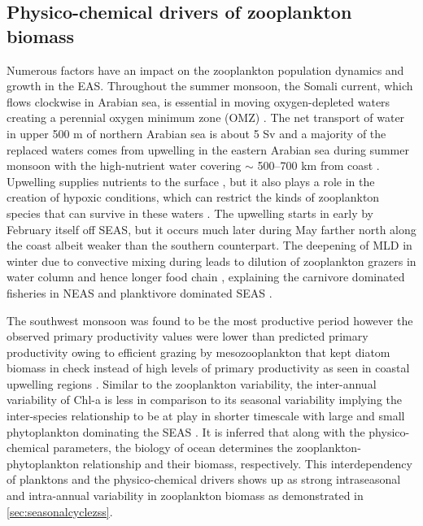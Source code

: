 \documentclass{article}
\begin{document}
	\subsection{Physico-chemical drivers of zooplankton biomass}
	Numerous factors have an impact on the zooplankton population dynamics and growth in the EAS. Throughout the summer monsoon, the Somali current, which flows clockwise in Arabian sea, is essential in moving oxygen-depleted waters creating a perennial oxygen minimum zone (OMZ) \citep{sarma2020potential,sudheesh2022omz}. The net transport of water in upper 500 m of northern Arabian sea is about 5 Sv and a majority of the replaced waters comes from upwelling in the eastern Arabian sea \citep{shi1999remotely} during summer monsoon with the high-nutrient water covering $\sim$ 500--700 km from coast \citep{morrison1998seasonal}. Upwelling supplies nutrients to the surface \citep{Kumar.2000}, but it also plays a role in the creation of hypoxic conditions, which can restrict the kinds of zooplankton species that can survive in these waters \citep{jayakumar.2004}. The upwelling starts in early by February itself off SEAS, but it occurs much later during May farther north along the coast \citep{banse1968hydrography,Kumar.2000,vijith2016consequences,sarma2020potential} albeit weaker than the southern counterpart. The deepening of MLD in winter due to convective mixing during \citep{marra2005jgofs, shankar2016inhibition,shi2022phytoplankton} leads to dilution of zooplankton grazers in water column \citep{marra2005jgofs} and hence longer food chain \citep{banse1995zooplankton,barber2001qn}, explaining the carnivore dominated fisheries in NEAS \citep{shankar2019role} and planktivore dominated SEAS \citep{longhurst1990gd,shankar2019role}. 
	
	The southwest monsoon was found to be the most productive period \citep{Kumar.2000} however the observed primary productivity values were lower than predicted primary productivity owing to efficient grazing by mesozooplankton that kept diatom biomass in check instead of high levels of primary productivity as seen in coastal upwelling regions \citep{barber2001qn}. Similar to the zooplankton variability, the inter-annual variability of Chl-a is less in comparison to its seasonal variability \citep{shi2022phytoplankton} implying the inter-species relationship to be at play in shorter timescale with large and small phytoplankton dominating the SEAS \citep{shankar2019role}. It is inferred that along with the physico-chemical parameters, the biology of ocean determines the zooplankton-phytoplankton relationship and their biomass, respectively. This interdependency of planktons and the physico-chemical drivers shows up as strong intraseasonal and intra-annual variability in zooplankton biomass as demonstrated in \autoref{sec:seasonalcyclezss}. 
\end{document}
